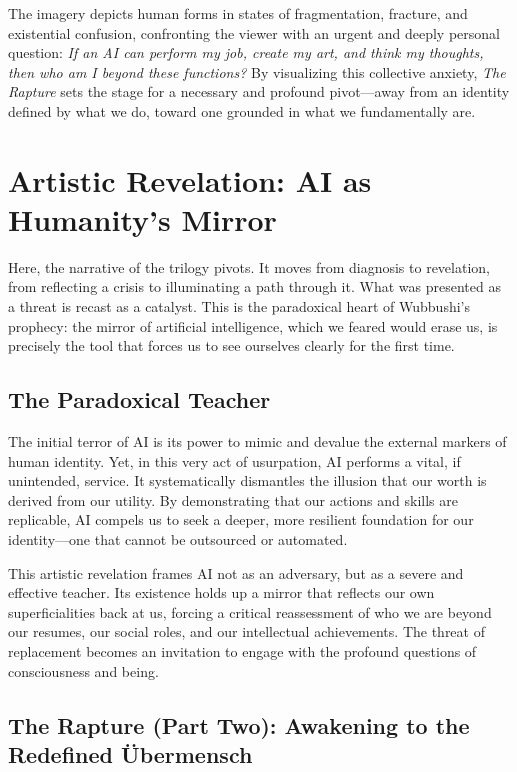 \documentclass[12pt]{article}
\begin{document}
The imagery depicts human forms in states of fragmentation, fracture, and existential confusion, confronting the viewer with an urgent and deeply personal question: \textit{If an AI can perform my job, create my art, and think my thoughts, then who am I beyond these functions?} By visualizing this collective anxiety, \textit{The Rapture} sets the stage for a necessary and profound pivot—away from an identity defined by what we do, toward one grounded in what we fundamentally are.

\section{Artistic Revelation: AI as Humanity's Mirror}

Here, the narrative of the trilogy pivots. It moves from diagnosis to revelation, from reflecting a crisis to illuminating a path through it. What was presented as a threat is recast as a catalyst. This is the paradoxical heart of Wubbushi's prophecy: the mirror of artificial intelligence, which we feared would erase us, is precisely the tool that forces us to see ourselves clearly for the first time.

\subsection{The Paradoxical Teacher}

The initial terror of AI is its power to mimic and devalue the external markers of human identity. Yet, in this very act of usurpation, AI performs a vital, if unintended, service. It systematically dismantles the illusion that our worth is derived from our utility. By demonstrating that our actions and skills are replicable, AI compels us to seek a deeper, more resilient foundation for our identity—one that cannot be outsourced or automated.

This artistic revelation frames AI not as an adversary, but as a severe and effective teacher. Its existence holds up a mirror that reflects our own superficialities back at us, forcing a critical reassessment of who we are beyond our resumes, our social roles, and our intellectual achievements. The threat of replacement becomes an invitation to engage with the profound questions of consciousness and being.

\subsection{The Rapture (Part Two): Awakening to the Redefined Übermensch}
\end{document}
